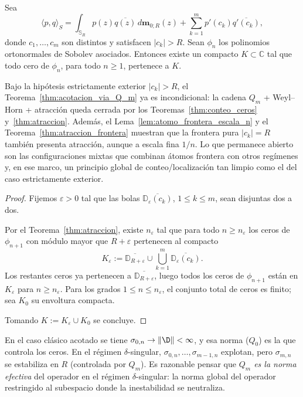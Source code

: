 \begin{thm}\label{thm:acotacion_via_Q_m}
	Sea
	\[
		\langle p,q\rangle_S
		=
		\int_{\mathbb S_R}p(z)\overline{q(z)}\,d\mathbf m_{0;R}(z)
		+
		\sum_{k=1}^m p'(c_k)\overline{q'(c_k)},
	\]
	donde $c_1,\dots,c_m$ son distintos y satisfacen $|c_k|>R$. Sean $\phi_n$ los polinomios ortonormales de Sobolev asociados.
	Entonces existe un compacto $K\subset\mathbb{C}$ tal que todo cero de $\phi_n$, para todo $n\ge 1$, pertenece a $K$.
\end{thm}

\begin{rmk}\label{rem:dependencia_condicional}
	Bajo la hipótesis estrictamente exterior $|c_k|>R$, el Teorema~\ref{thm:acotacion_via_Q_m} ya es incondicional: la cadena $Q_m$ + Weyl--Horn + atracción queda cerrada por los Teoremas~\ref{thm:conteo_ceros} y~\ref{thm:atraccion}. Además, el Lema~\ref{lem:atomo_frontera_escala_n} y el Teorema~\ref{thm:atraccion_frontera} muestran que la frontera pura $|c_k|=R$ también presenta atracción, aunque a escala fina $1/n$. Lo que permanece abierto son las configuraciones mixtas que combinan átomos frontera con otros regímenes y, en ese marco, un principio global de conteo/localización tan limpio como el del caso estrictamente exterior.
\end{rmk}

\begin{proof}
	Fijemos $\varepsilon>0$ tal que las bolas $\overline{\mathbb{D}_{\varepsilon}(c_k)}$, $1\le k\le m$, sean disjuntas dos a dos.

	Por el Teorema~\ref{thm:atraccion}, existe $n_\varepsilon$ tal que para todo $n\ge n_\varepsilon$ los ceros de $\phi_{n+1}$ con módulo mayor que $R+\varepsilon$ pertenecen al compacto
	\[
		K_\varepsilon:=\overline{\mathbb{D}_{R+\varepsilon}}\cup
		\bigcup_{k=1}^m\overline{\mathbb{D}_{\varepsilon}(c_k)}.
	\]
	Los restantes ceros ya pertenecen a $\overline{\mathbb D_{R+\varepsilon}}$, luego todos los ceros de $\phi_{n+1}$ están en $K_\varepsilon$ para $n\ge n_\varepsilon$.
	Para los grados $1\le n\le n_\varepsilon$, el conjunto total de ceros es finito; sea $K_0$ su envoltura compacta.

	Tomando $K:=K_\varepsilon\cup K_0$ se concluye.
\end{proof}

\begin{rmk}\label{rem:Q_m_norma_efectiva}
	En el caso clásico acotado se tiene $\sigma_{0,n}\to\|\D\|<\infty$, y esa norma ($Q_0$) es la que controla los ceros. En el régimen $\delta$-singular, $\sigma_{0,n},\dots,\sigma_{m-1,n}$ explotan, pero $\sigma_{m,n}$ se estabiliza en $R$ (controlada por $Q_m$). Es razonable pensar que \emph{$Q_m$ es la norma efectiva} del operador en el régimen $\delta$-singular: la norma global del operador restringido al subespacio donde la inestabilidad se neutraliza.
\end{rmk}

